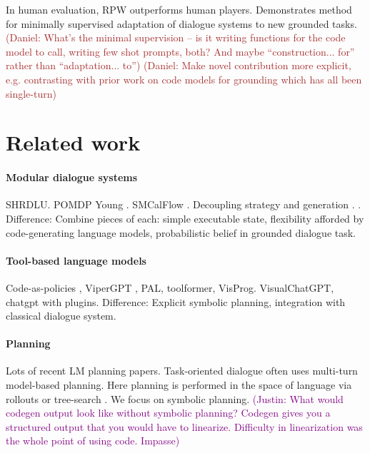 \documentclass[11pt]{article}
\newcommand{\system}{RPW}
\newcommand{\justin}[1]{{{\textcolor{purple}{(Justin: #1)}}}}
\newcommand{\daniel}[1]{{{\textcolor{brown}{(Daniel: #1)}}}}
\begin{document}
In human evaluation, \system{} outperforms human players.
Demonstrates method for minimally supervised adaptation of dialogue systems to new grounded tasks.
\daniel{What's the minimal supervision -- is it writing functions for the code model to call, writing few shot prompts, both? And maybe ``construction... for'' rather than ``adaptation... to''}
\daniel{Make novel contribution more explicit, e.g. contrasting with prior work on code models for grounding which has all been single-turn}

\section{Related work}

\paragraph{Modular dialogue systems}
SHRDLU. POMDP Young \citep{young2006pomdp}. SMCalFlow \citep{sm}.
Decoupling strategy and generation \citep{he2018dnd}. \citep{fstod}.
Difference: Combine pieces of each: simple executable state,
flexibility afforded by code-generating language models,
probabilistic belief in grounded dialogue task.

\paragraph{Tool-based language models}
Code-as-policies \citep{codeaspolicies2022}, ViperGPT \citep{vipergpt},
PAL, toolformer, VisProg.
VisualChatGPT, chatgpt with plugins.
Difference: Explicit symbolic planning,
integration with classical dialogue system.

\paragraph{Planning}
Lots of recent LM planning papers.
\citep{gandhi2023strategic}
Task-oriented dialogue often uses multi-turn model-based planning.
Here planning is performed in the space of language via rollouts or tree-search
\citep{dnd,yarats2017rollout,ingress,jang2020bapomdp}.
We focus on symbolic planning.
\justin{What would codegen output look like without symbolic planning?
Codegen gives you a structured output that you would have to linearize. Difficulty in linearization was the whole point of using code. Impasse}
\end{document}
